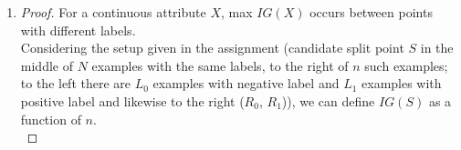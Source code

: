 \documentclass[12pt]{article}
\begin{document}
\begin{enumerate}
\begin{proof}
    Let $Y$ be the random variable which takes on the value of the class
    label. Then, $IG(X)=H(Y)-H(Y|X)$.\\

    Define mutual information $I(X;Y)$ to be
    $$\sum_{x,y}p(x,y)\log\frac{p(x,y)}{p(x)p(y)}$$\\

    Then,
    \begin{equation}
      \begin{split}
      I(X;Y)&=\sum_{x,y}p(x,y)\log\frac{p(y|x)}{p(x)}\\
      &=H(Y)-H(Y|X)\\
      \end{split}
    \end{equation}

    Applying Jensen's inequality to any term of the sum, we have
    \begin{equation}
      \begin{split}
      -p(x,y)\log\frac{p(x,y)}{p(x)p(y)}&=-p(x,y)\log\frac{p(x)p(y)}{p(x,y)}\\
      &\leq\log p(x,y)\frac{p(x)p(y)}{p(x,y)}\\
      &\leq\log p(x)p(y)\\
      \end{split}
    \end{equation}

    Now,
    \begin{equation}
      \begin{split}
      -I(X;Y)&=\sum_{x,y}-p(x,y)\log\frac{p(x)p(y)}{p(x,y)}\\
      &\leq\log\sum_{x,y}p(x,y)\\
      &\leq\log 1\\
      &\leq 0\\
      \end{split}
    \end{equation}

    So, $I(X;Y)$ is nonnegative, as is information gain.\\
    \end{proof}
  \item
    \begin{proof} For a continuous attribute $X$, max $IG(X)$ occurs between
      points with different labels.\\

      Considering the setup given in the assignment (candidate split point $S$
      in the middle of $N$ examples with the same labels, to the right of $n$ such
      examples; to the left there are $L_0$ examples with negative label and $L_1$
      examples with positive label and likewise to the right ($R_0$, $R_1$)), we can
      define $IG(S)$ as a function of $n$.\\


\end{proof}
\end{enumerate}
\end{document}
